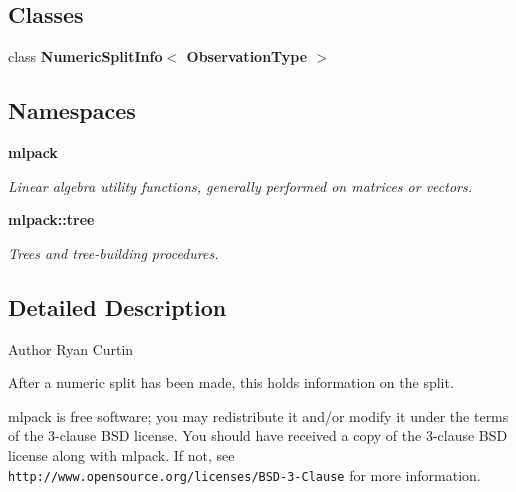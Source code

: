 \subsection*{Classes}
\begin{DoxyCompactItemize}
\item 
class \textbf{ Numeric\+Split\+Info$<$ Observation\+Type $>$}
\end{DoxyCompactItemize}
\subsection*{Namespaces}
\begin{DoxyCompactItemize}
\item 
 \textbf{ mlpack}
\begin{DoxyCompactList}\small\item\em Linear algebra utility functions, generally performed on matrices or vectors. \end{DoxyCompactList}\item 
 \textbf{ mlpack\+::tree}
\begin{DoxyCompactList}\small\item\em Trees and tree-\/building procedures. \end{DoxyCompactList}\end{DoxyCompactItemize}


\subsection{Detailed Description}
\begin{DoxyAuthor}{Author}
Ryan Curtin
\end{DoxyAuthor}
After a numeric split has been made, this holds information on the split.

mlpack is free software; you may redistribute it and/or modify it under the terms of the 3-\/clause B\+SD license. You should have received a copy of the 3-\/clause B\+SD license along with mlpack. If not, see {\tt http\+://www.\+opensource.\+org/licenses/\+B\+S\+D-\/3-\/\+Clause} for more information. 